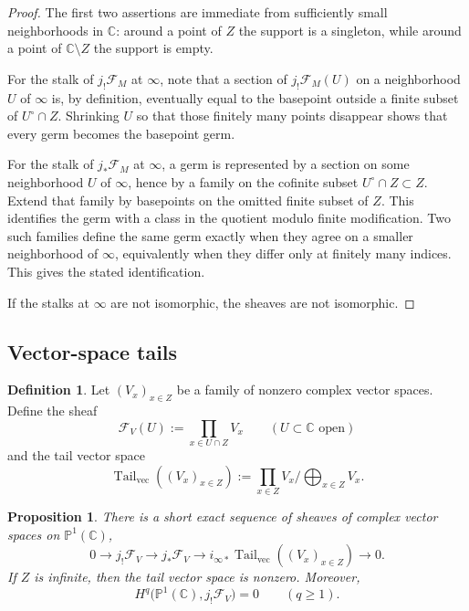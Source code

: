 \documentclass[11pt,a4paper]{article}
\newtheorem{proposition}[theorem]{Proposition}
\theoremstyle{definition}
\newtheorem{definition}[theorem]{Definition}
\theoremstyle{remark}
\DeclareMathOperator{\Tail}{Tail}
\newcommand{\CC}{\mathbb C}
\newcommand{\PP}{\mathbb P}
\begin{document}
\begin{proof}
The first two assertions are immediate from sufficiently small neighborhoods in $\CC$: around a point of $Z$ the support is a singleton, while around a point of $\CC\setminus Z$ the support is empty.

For the stalk of $j_!\mathcal F_M$ at $\infty$, note that a section of $j_!\mathcal F_M(U)$ on a neighborhood $U$ of $\infty$ is, by definition, eventually equal to the basepoint outside a finite subset of $U^\circ\cap Z$.  Shrinking $U$ so that those finitely many points disappear shows that every germ becomes the basepoint germ.

For the stalk of $j_*\mathcal F_M$ at $\infty$, a germ is represented by a section on some neighborhood $U$ of $\infty$, hence by a family on the cofinite subset $U^\circ\cap Z\subset Z$.  Extend that family by basepoints on the omitted finite subset of $Z$.  This identifies the germ with a class in the quotient modulo finite modification.  Two such families define the same germ exactly when they agree on a smaller neighborhood of $\infty$, equivalently when they differ only at finitely many indices.  This gives the stated identification.

If the stalks at $\infty$ are not isomorphic, the sheaves are not isomorphic.
\end{proof}

\subsection{Vector-space tails}

\begin{definition}
Let $(V_x)_{x\in Z}$ be a family of nonzero complex vector spaces.  Define the sheaf
\[
\mathcal F_V(U):=\prod_{x\in U\cap Z}V_x
\qquad (U\subset\CC\text{ open})
\]
and the tail vector space
\[
\Tail_{\mathrm{vec}}((V_x)_{x\in Z}):=\prod_{x\in Z}V_x\Big/\bigoplus_{x\in Z}V_x.
\]
\end{definition}

\begin{proposition}\label{prop:vector-tail-exact}
There is a short exact sequence of sheaves of complex vector spaces on $\PP^1(\CC)$,
\[
0\longrightarrow j_!\mathcal F_V
\longrightarrow j_*\mathcal F_V
\longrightarrow i_{\infty *}\Tail_{\mathrm{vec}}((V_x)_{x\in Z})
\longrightarrow0.
\]
If $Z$ is infinite, then the tail vector space is nonzero.  Moreover,
\[
H^q\bigl(\PP^1(\CC),j_!\mathcal F_V\bigr)=0
\qquad (q\ge1).
\]
\end{proposition}
\end{document}
